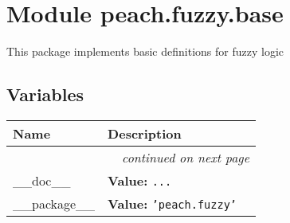 %
%
%


\section{Module peach.fuzzy.base}

    \label{peach:fuzzy:base}

This package implements basic definitions for fuzzy logic


  \subsection{Variables}

    \vspace{-1cm}
\hspace{\varindent}\begin{longtable}{|p{\varnamewidth}|p{\vardescrwidth}|l}
\cline{1-2}
\cline{1-2} \centering \textbf{Name} & \centering \textbf{Description}& \\
\cline{1-2}
\endhead\cline{1-2}\multicolumn{3}{r}{\small\textit{continued on next page}}\\\endfoot\cline{1-2}
\endlastfoot\raggedright \_\-\_\-d\-o\-c\-\_\-\_\- & \raggedright \textbf{Value:} 
{\tt \texttt{...}}&\\
\cline{1-2}
\raggedright \_\-\_\-p\-a\-c\-k\-a\-g\-e\-\_\-\_\- & \raggedright \textbf{Value:} 
{\tt \texttt{'}\texttt{peach.fuzzy}\texttt{'}}&\\
\cline{1-2}
\end{longtable}



